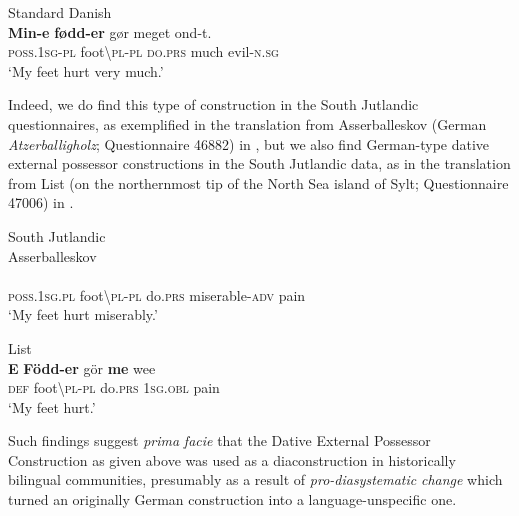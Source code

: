 \documentclass[output=paper]{langsci/langscibook}
\begin{document}
\ea\label{ex:hoeder:23}
	Standard Danish\\
	\gll \textbf{Min-e} \textbf{fødd-er} gør meget ond-t.\\
     \textsc{poss.1sg-pl} foot{\textbackslash}\textsc{pl-pl} \textsc{do.prs} much evil-\textsc{n.sg}\\
	\glt `My feet hurt very much.'
\z

Indeed, we do find this type of construction in the South Jutlandic questionnaires, as exemplified in the translation from Asserballeskov (German \textit{Atzerballigholz}; Questionnaire 46882) in , but we also find German-type dative external possessor constructions in the South Jutlandic data, as in the translation from List (on the northernmost tip of the North Sea island of Sylt; Questionnaire 47006) in .

\ea\label{ex:hoeder:24}
	South Jutlandic\\
	\ea\label{ex:hoeder:24a}
	Asserballeskov\\
	\\
     \textsc{poss.1sg.pl} foot{\textbackslash}\textsc{pl-pl} do.\textsc{prs} miserable-\textsc{adv} pain\\
	\glt `My feet hurt{} miserably.'

	\ex\label{ex:hoeder:24b}
	List\\
	\gll \textbf{E} \textbf{Född-er} gör \textbf{me} wee\\
     \textsc{def} foot{\textbackslash}\textsc{pl-pl}{} do.\textsc{prs} \textsc{1sg.obl} pain\\
	\glt `My feet hurt.'
	\z
\z

Such findings suggest \textit{prima} \textit{facie} that the Dative External Possessor Construction as given above was used as a diaconstruction in historically bilingual communities, presumably as a result of \textit{pro-diasystematic}{ }\textit{change} which turned an originally German construction into a language-unspecific one.
\end{document}
